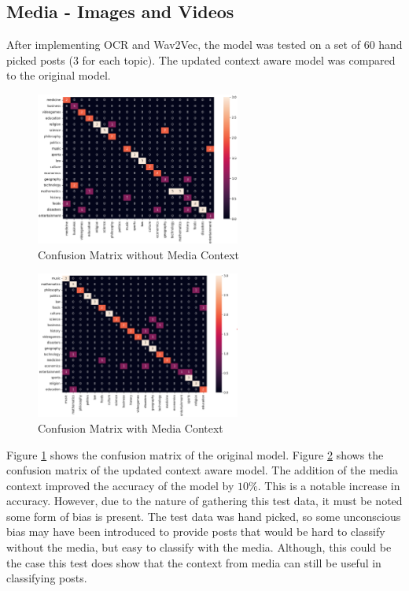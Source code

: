\subsection{Media - Images and Videos}
After implementing OCR and Wav2Vec, the model was tested on a set of 60 hand picked posts (3 for each topic). The updated context aware
model was compared to the original model.
\begin{figure}
    \centering
    \includegraphics[width=0.6\textwidth]{../images/confusion/Complete-no-media-confusion.png}
    \caption{Confusion Matrix without Media Context}
    \label{fig:confusion}
\end{figure}
\begin{figure}
    \centering
    \includegraphics[width=0.6\textwidth]{../images/confusion/Complete-Model-test.png}
    \caption{Confusion Matrix with Media Context}
    \label{fig:media}
\end{figure}

Figure \ref{fig:confusion} shows the confusion matrix of the original model. Figure \ref{fig:media} shows the confusion matrix of the
updated context aware model. The addition of the media context improved the accuracy of the model by $10\%$. This is a notable increase
in accuracy. However, due to the nature of gathering this test data, it must be noted some form of bias is present. The test data was
hand picked, so some unconscious bias may have been introduced to provide posts that would be hard to classify without the media,
but easy to classify with the media. Although, this could be the case this test does show that the context from media can still be useful
in classifying posts.\\
